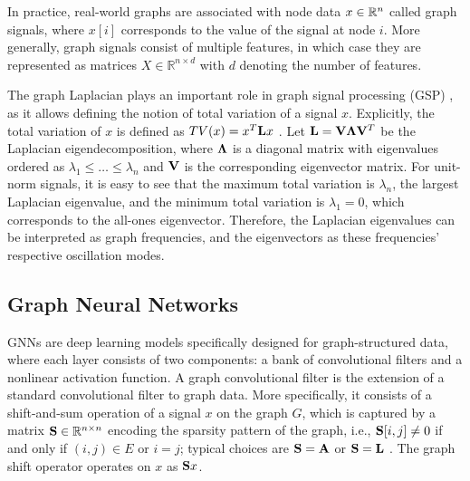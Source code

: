 \documentclass[conference]{IEEEtran}
\theoremstyle{definition}
\begin{document}
In practice, real-world graphs are associated with node data $x \in {\mathbb R}^n$ called graph signals, where $x[i]$ corresponds to the value of the signal at node $i$. More generally, graph signals consist of multiple features, in which case they are represented as matrices $X \in \mathbb{R}^{n \times d}$ with $d$ denoting the number of features. 

The graph Laplacian plays an important role in graph signal processing (GSP) \cite{shuman13-mag,sandryhaila13-dspg}, as it allows defining the notion of total variation of a signal $x$. Explicitly, the total variation of $x$ is defined as $TV(x)=x^T{\mathbf L} x$ \cite{ortega2018graph}. Let ${\mathbf L}={\mathbf V}\boldsymbol{\Lambda}{\mathbf V}^T$ be the Laplacian eigendecomposition, where $\boldsymbol{\Lambda}$ is a diagonal matrix with eigenvalues ordered as $\lambda_1 \leq \ldots \leq \lambda_n$ and ${\mathbf V}$ is the corresponding eigenvector matrix. For unit-norm signals, it is easy to see that the maximum total variation is $\lambda_n$, the largest Laplacian eigenvalue, and the minimum total variation is $\lambda_1=0$, which corresponds to the all-ones eigenvector. Therefore, the Laplacian eigenvalues can be interpreted as graph frequencies, and the eigenvectors as these frequencies' respective oscillation modes.


\subsection{Graph Neural Networks} 

GNNs are deep learning models specifically designed for graph-structured data, where each layer consists of two components: a bank of convolutional filters and a nonlinear activation function. 
A graph convolutional filter is the extension of a standard convolutional filter to graph data. More specifically, it consists of a shift-and-sum operation of a signal $x$ on the graph $G$, which is captured by a matrix ${\mathbf S} \in {\mathbb R}^{n\times n}$ encoding the sparsity pattern of the graph, i.e., ${\mathbf S}[i,j] \neq 0$ if and only if $(i,j) \in E$ or $i=j$; typical choices are ${\mathbf S}={\mathbf A}$ or ${\mathbf S}={\mathbf L}$ \cite{segarra17-linear}. The graph shift operator operates on $x$ as ${\mathbf S} x$.
\end{document}
